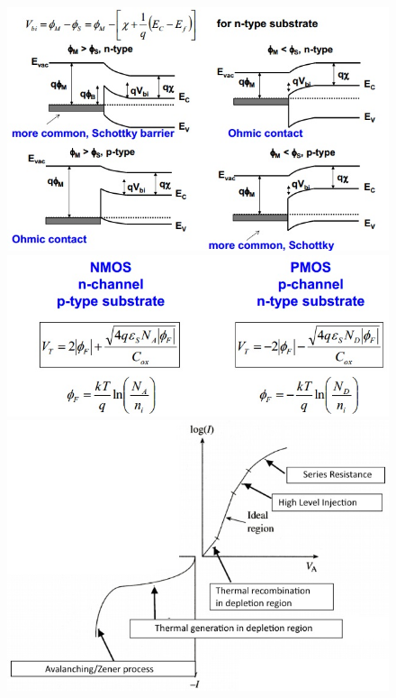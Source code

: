 \documentclass[11pt,landscape]{article}
\begin{document}
\begin{multicols}{3}
\setlength{\premulticols}{1pt}
\setlength{\postmulticols}{1pt}
\setlength{\multicolsep}{1pt}
\setlength{\columnsep}{2pt}

\begin{figure}[H]
    \includegraphics[scale=0.50]{./Images/2/MSContact.jpg}
    \includegraphics[scale=0.50]{./Images/2/MOSwork.jpg}
    \includegraphics[scale=0.50]{./Images/2/DiodeIV.jpg}

\end{figure}
\end{multicols}
\end{document}
